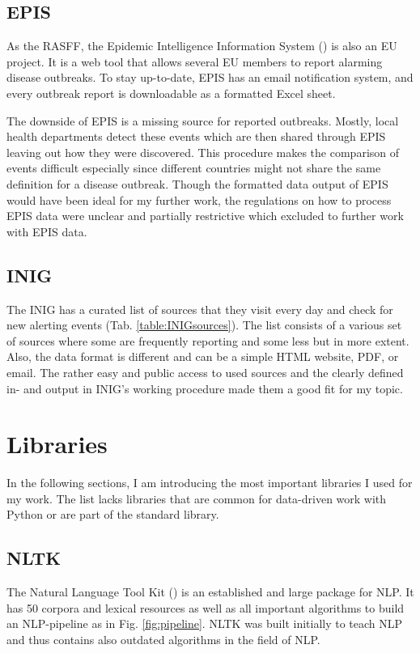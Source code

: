\subsection{EPIS}
  As the RASFF, the Epidemic Intelligence Information System () is also an EU project.
  It is a web tool that allows several EU members to report alarming disease outbreaks.
  To stay up-to-date, EPIS has an email notification system, and every outbreak report is downloadable as a formatted Excel sheet.

  The downside of EPIS is a missing source for reported outbreaks.
  Mostly, local health departments detect these events which are then shared through EPIS leaving out how they were discovered.
  This procedure makes the comparison of events difficult especially since different countries might not share the same definition for a disease outbreak.
  Though the formatted data output of EPIS would have been ideal for my further work, the regulations on how to process EPIS data were unclear and partially restrictive which excluded to further work with EPIS data.

\subsection{INIG}\label{INIGsources}
  The INIG has a curated list of sources that they visit every day and check for new alerting events (Tab. \ref{table:INIGsources}).
  The list consists of a various set of sources where some are frequently reporting and some less but in more extent.
  Also, the data format is different and can be a simple HTML website, PDF, or email.
  The rather easy and public access to used sources and the clearly defined in- and output in INIG's working procedure made them a good fit for my topic.

\section{Libraries}
  In the following sections, I am introducing the most important libraries I used for my work.
  The list lacks libraries that are common for data-driven work with Python or are part of the standard library.

\subsection{NLTK}
  The Natural Language Tool Kit () is an established and large package for NLP.
  It has 50 corpora and lexical resources as well as all important algorithms to build an NLP-pipeline as in Fig. \ref{fig:pipeline}.
  NLTK was built initially to teach NLP and thus contains also outdated algorithms in the field of NLP.

